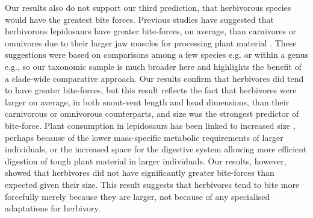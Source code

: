 \documentclass[a4paper, 12pt]{article}
\begin{document}
Our results also do not support our third prediction, that herbivorous species would have the greatest bite forces.
Previous studies have suggested that herbivorous lepidosaurs have greater bite-forces, on average, than carnivores or omnivores due to their larger jaw muscles for processing plant material \cite{metzger2005correlations,cooper2002distribution,herrel1999morphology,herrel1999sexual,herrel2004omnivory,Herrel2008,herrel2014does}.
These suggestions were based on comparisons among a few species e.g.\cite{herrel2014does,herrel2004omnivory} or within a genus e.g.\cite{lopez2015sex}, so our taxonomic sample is much broader here and highlights the benefit of a clade-wide comparative approach. 
Our results confirm that herbivores did tend to have greater bite-forces, but this result reflects the fact that herbivores were larger on average, in both snout-vent length and head dimensions, than their carnivorous or omnivorous counterparts, and size was the strongest predictor of bite-force. 
Plant consumption in lepidosaurs has been linked to increased size \cite{cooper2002distribution,herrel2014does,metzger2005correlations}, perhaps because of the lower mass-specific metabolic requirements of larger individuals, or the increased space for the digestive system allowing more efficient digestion of tough plant material in larger individuals\cite{herrel2014does,espinoza2004recurrent}.
Our results, however, showed that herbivores did not have significantly greater bite-forces than expected given their size. This result suggests that herbivores tend to bite more forcefully merely because they are larger, not because of any specialised adaptations for herbivory. 
\end{document}

